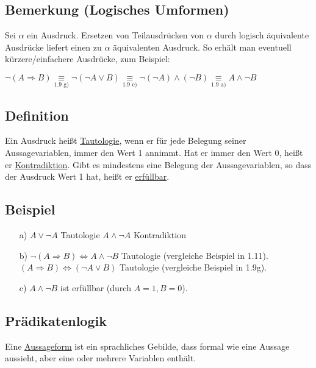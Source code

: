 \documentclass[a4paper, 12pt, twoside] {article}
\begin{document}
\subsection{Bemerkung (Logisches Umformen)} %
Sei $\alpha$ ein Ausdruck. Ersetzen von Teilausdrücken von $\alpha$ durch logisch äquivalente Ausdrücke liefert einen zu $\alpha$ äquivalenten Ausdruck. So erhält man eventuell kürzere/einfachere Ausdrücke, zum Beispiel:

$\neg (A \Rightarrow B) \underset{\text{1.9 g})}{\equiv} \neg (\neg A \lor B) \underset{\text{1.9 e)}}{\equiv} \neg (\neg A) \wedge (\neg B) \underset{\text{1.9 a)}}{\equiv} A \wedge \neg B$


\subsection[Definition (Tautologie, Kontradiktion, Erfüllbarkeit)]{Definition} %
Ein Ausdruck heißt \underline{Tautologie}, wenn er für jede Belegung seiner Aussagevariablen, immer den Wert 1 annimmt. Hat er immer den Wert 0, heißt er \underline{Kontradiktion}. 
Gibt es mindestens eine Belegung der Aussagevariablen, so dass der Ausdruck Wert 1 hat, heißt er \underline{erfüllbar}.

\subsection{Beispiel} %
\begin{itemize}
\item[a)] $A \lor \neg A$ Tautologie \newline $A \wedge \neg A$ Kontradiktion

\item[b)] $\neg (A \Rightarrow B ) \Leftrightarrow A \wedge \neg B$ Tautologie (vergleiche Beispiel in 1.11). \newline
$(A \Rightarrow B) \Leftrightarrow (\neg A \lor B)$ Tautologie (vergleiche Beispiel in 1.9g).

\item[c)] $A \wedge \neg B$ ist erfüllbar (durch $A = 1, B = 0$).
\end{itemize}

\subsection*{Prädikatenlogik}
Eine \underline{Aussageform} ist ein sprachliches Gebilde, dass formal wie eine Aussage aussieht, aber eine oder mehrere Variablen enthält.
\end{document}
